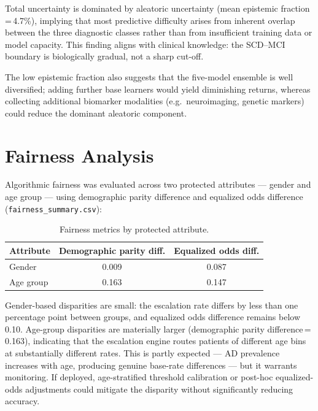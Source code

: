 \documentclass[12pt, a4paper]{report}
\begin{document}
  Total uncertainty is dominated by aleatoric uncertainty (mean epistemic
  fraction\,=\,4.7\%), implying that most predictive difficulty arises from
  inherent overlap between the three diagnostic classes rather than from
  insufficient training data or model capacity.  This finding aligns with clinical
  knowledge: the SCD--MCI boundary is biologically gradual, not a sharp cut-off.

  The low epistemic fraction also suggests that the five-model ensemble is well
  diversified; adding further base learners would yield diminishing returns, whereas
  collecting additional biomarker modalities (e.g.\ neuroimaging, genetic markers)
  could reduce the dominant aleatoric component.

  \section{Fairness Analysis}
  \label{sec:fairness}

  Algorithmic fairness was evaluated across two protected attributes --- gender
  and age group --- using demographic parity difference and equalized odds
  difference (\texttt{fairness\_summary.csv}):

  \begin{table}[htbp]
    \centering
    \caption{Fairness metrics by protected attribute.}
    \label{tab:fairness}
    \begin{tabular}{lSS}
      \toprule
      {Attribute} & {Demographic parity diff.} & {Equalized odds diff.} \\
      \midrule
      Gender    & 0.009 & 0.087 \\
      Age group & 0.163 & 0.147 \\
      \bottomrule
    \end{tabular}
  \end{table}

  Gender-based disparities are small: the escalation rate differs by less than one
  percentage point between groups, and equalized odds difference remains below 0.10.
  Age-group disparities are materially larger (demographic parity
  difference\,=\,0.163), indicating that the escalation engine routes patients of
  different age bins at substantially different rates.  This is partly expected ---
  AD prevalence increases with age, producing genuine base-rate differences --- but
  it warrants monitoring.  If deployed, age-stratified threshold calibration or
  post-hoc equalized-odds adjustments could mitigate the disparity without
  significantly reducing accuracy.
\end{document}
